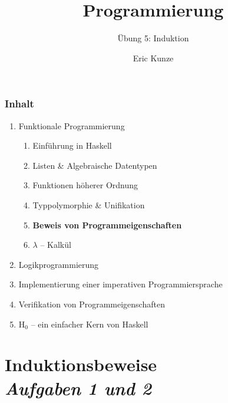 \documentclass{beamer}
\begin{document}
	
	\title{Programmierung}
	\subtitle{Übung 5: Induktion}
	\author{Eric Kunze}
	\date{}
	
	\maketitle
	


\begin{frame}[fragile] \frametitle{Inhalt}
	\begin{enumerate}
		\item Funktionale Programmierung
		\begin{enumerate}
			\item Einführung in Haskell
			\item Listen \& Algebraische Datentypen
			\item Funktionen höherer Ordnung
			\item Typpolymorphie \& Unifikation
			\item \textbf{Beweis von Programmeigenschaften}
			\item $\lambda$ -- Kalkül
		\end{enumerate}
		\item Logikprogrammierung
		\item Implementierung einer imperativen Programmiersprache
		\item Verifikation von Programmeigenschaften
		\item H${}_\text{0}$ -- ein einfacher Kern von Haskell
	\end{enumerate}
\end{frame}



\section{Induktionsbeweise \\ \textit{\normalsize Aufgaben 1 und 2}}
\end{document}
